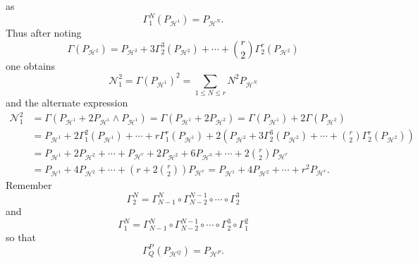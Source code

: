 \documentclass[aps,preprint]{revtex4}%
\begin{document}
as%
\[
\Gamma_{1}^{N}\left(  P_{\mathcal{H}^{1}}\right)  =P_{\mathcal{H}^{N}}.
\]
Thus after noting
\[
\Gamma\left(  P_{\mathcal{H}^{2}}\right)  =P_{\mathcal{H}^{2}}+3\Gamma_{2}%
^{3}\left(  P_{\mathcal{H}^{2}}\right)  +\cdots+\binom{r}{2}\Gamma_{2}%
^{r}\left(  P_{\mathcal{H}^{2}}\right)
\]
one obtains
\[
\mathcal{N}_{1}^{2}=\Gamma\left(  P_{\mathcal{H}^{1}}\right)  ^{2}=\sum_{1\leq
N\leq r}N^{2}P_{\mathcal{H}^{N}}%
\]
and the alternate expression
\begin{align*}
\mathcal{N}_{1}^{2}  &  =\Gamma\left(  P_{\mathcal{H}^{1}}+2P_{\mathcal{H}%
^{1}}\wedge P_{\mathcal{H}^{1}}\right)  =\Gamma\left(  P_{\mathcal{H}^{1}%
}+2P_{\mathcal{H}^{2}}\right)  =\Gamma\left(  P_{\mathcal{H}^{1}}\right)
+2\Gamma\left(  P_{\mathcal{H}^{2}}\right) \\
&  =P_{\mathcal{H}^{1}}+2\Gamma_{1}^{2}\left(  P_{\mathcal{H}^{1}}\right)
+\cdots+r\Gamma_{1}^{r}\left(  P_{\mathcal{H}^{1}}\right)  +2\left(
P_{\mathcal{H}^{2}}+3\Gamma_{2}^{3}\left(  P_{\mathcal{H}^{2}}\right)
+\cdots+\binom{r}{2}\Gamma_{2}^{r}\left(  P_{\mathcal{H}^{2}}\right)  \right)
\\
&  =P_{\mathcal{H}^{1}}+2P_{\mathcal{H}^{2}}+\cdots+P_{\mathcal{H}^{r}%
}+2P_{\mathcal{H}^{2}}+6P_{\mathcal{H}^{3}}+\cdots+2\binom{r}{2}%
P_{\mathcal{H}^{r}}\\
&  =P_{\mathcal{H}^{1}}+4P_{\mathcal{H}^{2}}+\cdots+\left(  r+2\binom{r}%
{2}\right)  P_{\mathcal{H}^{r}}=P_{\mathcal{H}^{1}}+4P_{\mathcal{H}^{2}%
}+\cdots+r^{2}P_{\mathcal{H}^{r}}.
\end{align*}
Remember
\[
\Gamma_{2}^{N}=\Gamma_{N-1}^{N}\circ\Gamma_{N-2}^{N-1}\circ\cdots\circ
\Gamma_{2}^{3}%
\]
and
\[
\Gamma_{1}^{N}=\Gamma_{N-1}^{N}\circ\Gamma_{N-2}^{N-1}\circ\cdots\circ
\Gamma_{2}^{3}\circ\Gamma_{1}^{2}%
\]
so that
\[
\Gamma_{Q}^{P}\left(  P_{\mathcal{H}^{Q}}\right)  =P_{\mathcal{H}^{P}}.
\]
\end{document}
